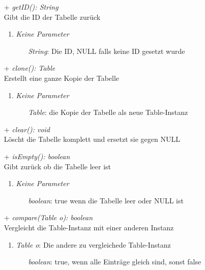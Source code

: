 \begin{itemize}
	\item[+] \textit{getID(): String} \\
	Gibt die ID der Tabelle zurück
	\begin{enumerate}
		\item \textit{Keine Parameter}
		\begin{itemize}
			\item[] \textit{String}: Die ID, NULL falls keine ID gesetzt wurde
		\end{itemize}
	\end{enumerate}
	
	\item[+] \textit{clone(): Table} \\
	Erstellt eine ganze Kopie der Tabelle
	\begin{enumerate}
		\item \textit{Keine Parameter}
		\begin{itemize}
			\item[] \textit{Table}: die Kopie der Tabelle als neue Table-Instanz
		\end{itemize}
	\end{enumerate}

	\item[+] \textit{clear(): void} \\
	Löscht die Tabelle komplett und ersetzt sie gegen NULL
	
	\item[+] \textit{isEmpty(): boolean} \\
	Gibt zurück ob die Tabelle leer ist
	\begin{enumerate}
		\item \textit{Keine Parameter}
		\begin{itemize}
			\item[] \textit{boolean}: true wenn die Tabelle leer oder NULL ist
		\end{itemize}
	\end{enumerate}

	\item[+] \textit{compare(Table o): boolean} \\
	Vergleicht die Table-Instanz mit einer anderen Instanz
	\begin{enumerate}
		\item \textit{Table o}: Die andere zu vergleichede Table-Instanz
		\begin{itemize}
			\item[] \textit{boolean}: true, wenn alle Einträge gleich sind, sonst false
		\end{itemize}
	\end{enumerate}
\end{itemize}